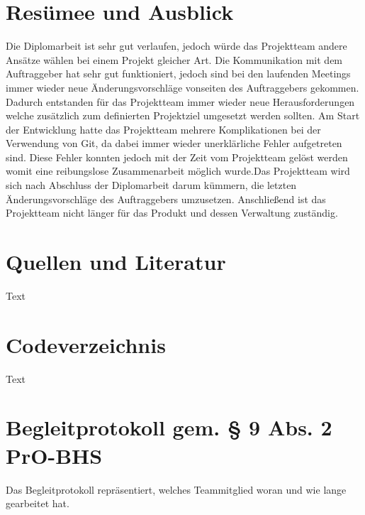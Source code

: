 \chapter{Resümee und Ausblick}
Die Diplomarbeit ist sehr gut verlaufen, jedoch würde das Projektteam andere Ansätze wählen bei einem Projekt gleicher Art. Die Kommunikation mit dem Auftraggeber hat sehr gut funktioniert, jedoch sind bei den laufenden Meetings immer wieder neue Änderungsvorschläge vonseiten des Auftraggebers gekommen. Dadurch entstanden für das Projektteam immer wieder neue Herausforderungen welche zusätzlich zum definierten Projektziel umgesetzt werden sollten. Am Start der Entwicklung hatte das Projektteam mehrere Komplikationen bei der Verwendung  von Git, da dabei immer wieder unerklärliche Fehler aufgetreten sind. Diese Fehler konnten jedoch mit der Zeit vom Projektteam gelöst werden womit eine reibungslose Zusammenarbeit möglich wurde.Das Projektteam wird sich nach Abschluss der Diplomarbeit darum kümmern, die letzten Änderungsvorschläge des Auftraggebers umzusetzen. Anschließend ist das Projektteam nicht länger für das Produkt und dessen Verwaltung zuständig.


\chapter{Quellen und Literatur}
Text

\listoffigures

\listoftables

\chapter{Codeverzeichnis}
Text


\chapter{Begleitprotokoll gem. § 9 Abs. 2 PrO-BHS}
Das Begleitprotokoll repräsentiert, welches Teammitglied woran und wie lange gearbeitet hat.

